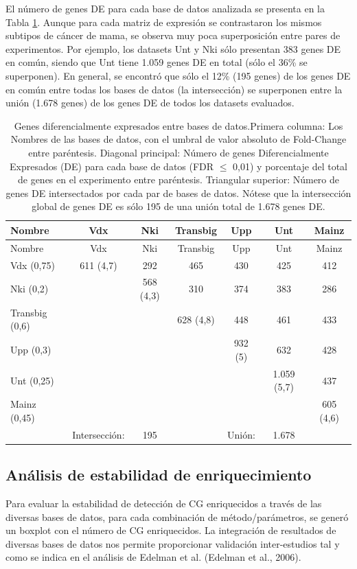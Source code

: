 \documentclass[12pt,twoside]{reedthesis}
\begin{document}
El número de genes DE para cada base de datos analizada se presenta en la Tabla \ref{tab:deGenes}. Aunque para cada matriz de expresión se contrastaron los mismos subtipos de cáncer de mama, se observa muy poca superposición entre pares de experimentos. Por ejemplo, los datasets Unt y Nki sólo presentan 383 genes DE en común, siendo que Unt tiene 1.059 genes DE en total (sólo el 36\% se superponen). En general, se encontró que sólo el 12\% (195 genes) de los genes DE en común entre todas los bases de datos (la intersección) se superponen entre la unión (1.678 genes) de los genes DE de todos los datasets evaluados.
\begin{longtable}[]{@{}lcccccc@{}}
\caption{Genes diferencialmente expresados entre bases de datos.\label{tab:deGenes}
Primera columna: Los Nombres de las bases de datos, con el umbral de valor absoluto de Fold-Change entre paréntesis. Diagonal principal: Número de genes Diferencialmente Expresados (DE) para cada base de datos (FDR \(\leq\) 0,01) y porcentaje del total de genes en el experimento entre paréntesis. Triangular superior: Número de genes DE intersectados por cada par de bases de datos. Nótese que la intersección global de genes DE es sólo 195 de una unión total de 1.678 genes DE.}\tabularnewline
\toprule
Nombre & Vdx & Nki & Transbig & Upp & Unt & Mainz\tabularnewline
\midrule
\endfirsthead
\toprule
Nombre & Vdx & Nki & Transbig & Upp & Unt & Mainz\tabularnewline
\midrule
\endhead
Vdx (0,75) & 611 (4,7) & 292 & 465 & 430 & 425 & 412\tabularnewline
Nki (0,2) & & 568 (4,3) & 310 & 374 & 383 & 286\tabularnewline
Transbig (0,6) & & & 628 (4,8) & 448 & 461 & 433\tabularnewline
Upp (0,3) & & & & 932 (5) & 632 & 428\tabularnewline
Unt (0,25) & & & & & 1.059 (5,7) & 437\tabularnewline
Mainz (0,45) & & & & & & 605 (4,6)\tabularnewline
& Intersección: & 195 & & Unión: & 1.678 &\tabularnewline
\bottomrule
\end{longtable}
\hypertarget{analisis-de-estabilidad-de-enriquecimiento}{%
\subsection{Análisis de estabilidad de enriquecimiento}\label{analisis-de-estabilidad-de-enriquecimiento}}

\par

Para evaluar la estabilidad de detección de CG enriquecidos a través de las diversas bases de datos, para cada combinación de método/parámetros, se generó un boxplot con el número de CG enriquecidos. La integración de resultados de diversas bases de datos nos permite proporcionar validación inter-estudios tal y como se indica en el análisis de Edelman et al. (Edelman et al., 2006).
\end{document}
